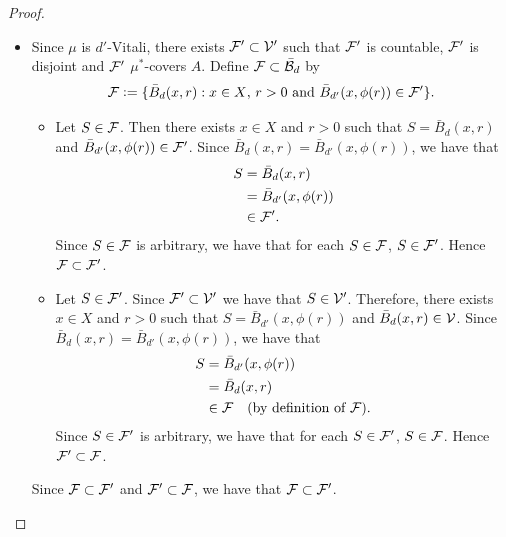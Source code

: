 \documentclass{book}
\begin{document}
\begin{proof}
\begin{itemize}
\begin{itemize}
				\begin{align*}
					\bar{B}_{d'}(x, r')
					& = \bar{B}_{d'}(x, \phi(r)) \\
					& \in \MV'.
				\end{align*}
				Thus 
				\begin{align*}
					0 
					& \leq \inf \{r' > 0: \bar{B}_{d'}(x, r') \in \MV'\} \\
					& < \ep.
				\end{align*}
				Since $\ep > 0$ is arbitrary, we have that $\inf \{r' > 0: \bar{B}_{d'}(x, r') \in \MV'\} = 0$. Thus $\MV'$ is fine at $x$. Since $x \in A$ is arbitrary, we have that for each $x \in A$, $\MV'$ is fine at $x$. Therefore $\MV'$ is fine on $A$.
				\item Since $\mu$ is $d'$-Vitali, there exists $\mathcal{F}' \subset \mathcal{V}'$ such that $\mathcal{F}'$ is countable, $\mathcal{F}'$ is disjoint and $\mathcal{F}'$ $\mu^*$-covers $A$. Define $\mathcal{F} \subset \bar{\mathcal{B}}_d$ by 
				$$\mathcal{F} \vcentcolon= \{\bar{B}_d(x, r): \text{$x \in X$, $r > 0$ and $\bar{B}_{d'}(x, \phi(r)) \in \mathcal{F}'$}\}.$$ 
				\begin{itemize}
					\item Let $S \in \mathcal{F}$. Then there exists $x \in X$ and $r > 0$ such that $S = \bar{B}_d(x,r)$ and $\bar{B}_{d'}(x,\phi(r)) \in \mathcal{F}'$. Since $\bar{B}_d(x,r) = \bar{B}_{d'}(x, \phi(r))$, we have that 
					\begin{align*}
						S
						& = \bar{B}_d(x,r) \\
						& = \bar{B}_{d'}(x, \phi(r)) \\
						& \in \mathcal{F}'.
					\end{align*}
					Since $S \in \mathcal{F}$ is arbitrary, we have that for each $S \in \mathcal{F}$, $S \in \mathcal{F}'$. Hence $\mathcal{F} \subset \mathcal{F}'$.
					\item Let $S \in \mathcal{F}'$. Since $\mathcal{F}' \subset \mathcal{V}'$ we have that $S \in \mathcal{V}'$. Therefore, there exists $x \in X$ and $r > 0$ such that $S = \bar{B}_{d'}(x,\phi(r))$ and $\bar{B}_d(x, r) \in \mathcal{V}$. Since $\bar{B}_d(x,r) = \bar{B}_{d'}(x, \phi(r))$, we have that 
					\begin{align*}
						S 
						& = \bar{B}_{d'}(x,\phi(r)) \\
						& = \bar{B}_d(x, r) \\
						& \in \mathcal{F} \quad \text{(by definition of $\mathcal{F}$)}.
					\end{align*}
					Since $S \in \mathcal{F}'$ is arbitrary, we have that for each $S \in \mathcal{F}'$, $S \in \mathcal{F}$. Hence $\mathcal{F}' \subset \mathcal{F}$.
				\end{itemize}
				Since $\mathcal{F} \subset \mathcal{F}'$ and $\mathcal{F}' \subset \mathcal{F}$, we have that $\mathcal{F} \subset \mathcal{F}'$. 

\end{itemize}
\end{itemize}
\end{proof}
\end{document}
